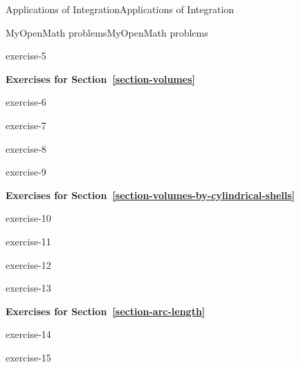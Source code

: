 \documentclass[10pt,]{book}
\numberwithin{equation}{section}
\begin{document}
\begin{chapterptx}{Applications of Integration}{}{Applications of Integration}{}{}
\begin{exercises-section}{MyOpenMath problems}{}{MyOpenMath problems}{}{}
\begin{exercisegroup}{1}
\begin{divisionexercise}{5}{}{}{exercise-5}%
\end{divisionexercise}%
\end{exercisegroup}
\par\medskip\noindent
\par\medskip\noindent%
\textbf{Exercises for Section~\ref*{section-volumes}}\space\space\hypertarget{exercisegroup-2}{}%
\begin{exercisegroup}{1}
\begin{divisionexercise}{6}{}{}{exercise-6}%
\end{divisionexercise}%
\begin{divisionexercise}{7}{}{}{exercise-7}%
\end{divisionexercise}%
\begin{divisionexercise}{8}{}{}{exercise-8}%
\end{divisionexercise}%
\begin{divisionexercise}{9}{}{}{exercise-9}%
\end{divisionexercise}%
\end{exercisegroup}
\par\medskip\noindent
\par\medskip\noindent%
\textbf{Exercises for Section~\ref*{section-volumes-by-cylindrical-shells}}\space\space\hypertarget{exercisegroup-3}{}%
\begin{exercisegroup}{1}
\begin{divisionexercise}{10}{}{}{exercise-10}%
\end{divisionexercise}%
\begin{divisionexercise}{11}{}{}{exercise-11}%
\end{divisionexercise}%
\begin{divisionexercise}{12}{}{}{exercise-12}%
\end{divisionexercise}%
\begin{divisionexercise}{13}{}{}{exercise-13}%
\end{divisionexercise}%
\end{exercisegroup}
\par\medskip\noindent
\par\medskip\noindent%
\textbf{Exercises for Section~\ref*{section-arc-length}}\space\space\hypertarget{exercisegroup-4}{}%
\begin{exercisegroup}{1}
\begin{divisionexercise}{14}{}{}{exercise-14}%
\end{divisionexercise}%
\begin{divisionexercise}{15}{}{}{exercise-15}%

\end{divisionexercise}
\end{exercisegroup}
\end{exercises-section}
\end{chapterptx}
\end{document}
